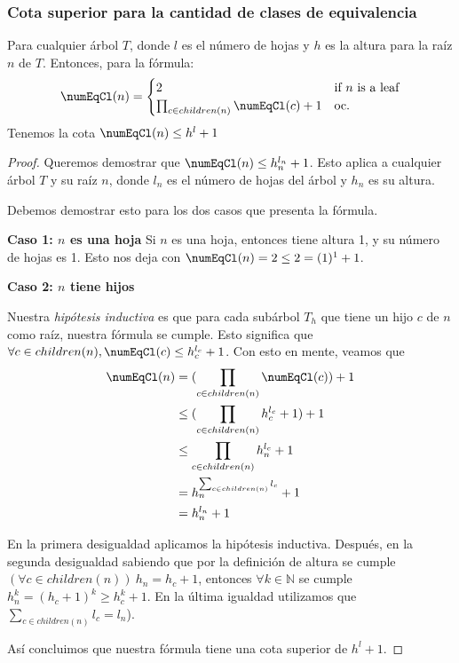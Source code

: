 \subsubsection{Cota superior para la cantidad de clases de equivalencia} \label{subsubSection:proofUpperBoundEquivalenceClasses}

\begin{lemma}
    Para cualquier árbol $T$, donde $l$ es el número de hojas y $h$ es la altura para la raíz $n$ de $T$. Entonces, para la fórmula: 
    \[
    \numEqCl(n) = 
    \begin{cases} 
    2 & \text{if $n$ is a leaf} \\
    \prod_{c \in children(n)} \numEqCl(c) + 1 & \text{oc.}
    \end{cases}
    \]
    Tenemos la cota $\numEqCl(n) \leq h^{l} + 1$
      
\end{lemma}

\begin{proof}
    Queremos demostrar que $\numEqCl(n) \leq h_n^{l_n} + 1$. Esto aplica a cualquier árbol $T$ y su raíz $n$, donde $l_n$ es el número de hojas del árbol y $h_n$ es su altura.

    Debemos demostrar esto para los dos casos que presenta la fórmula.

    \textbf{Caso 1: $n$ es una hoja}
    Si $n$ es una hoja, entonces tiene altura 1, y su número de hojas es 1. Esto nos deja con $\numEqCl(n) = 2 \leq  2 = (1)^1 + 1$. 

    \textbf{Caso 2: $n$ tiene hijos}

    Nuestra \textit{hipótesis inductiva} es que para cada subárbol $T_h$ que tiene un hijo $c$ de $n$ como raíz, nuestra fórmula se cumple. Esto significa que $\forall c \in children(n), \numEqCl(c) \leq h_c^{l_c} + 1$. Con esto en mente, veamos que
\begin{align*}
    \numEqCl(n)  
        &= (\prod_{c \in children(n)} \numEqCl(c)) + 1 \\
        &\leq (\prod_{c \in children(n)} h_c^{l_c} + 1) + 1 \\
       &\leq \prod_{c \in children(n)} h_n^{l_c} + 1 \\
        &= h_n^{\sum_{c \in children(n)} l_c} + 1 \\
        &= h_n^{l_n} + 1 
\end{align*}


    En la primera desigualdad aplicamos la hipótesis inductiva. Después, en la segunda desigualdad sabiendo que por la definición de altura se cumple $(\forall c \in children(n)) \ h_n = h_c + 1$, entonces $\forall k \in \mathbb{N}$ se cumple $h_n^k = (h_c + 1)^k \geq h_c^k + 1$. En la última igualdad utilizamos que $\sum_{c \in children(n)} l_c = l_n$).

    Así concluimos que nuestra fórmula tiene una cota superior de $h^l + 1$. 
\end{proof}

